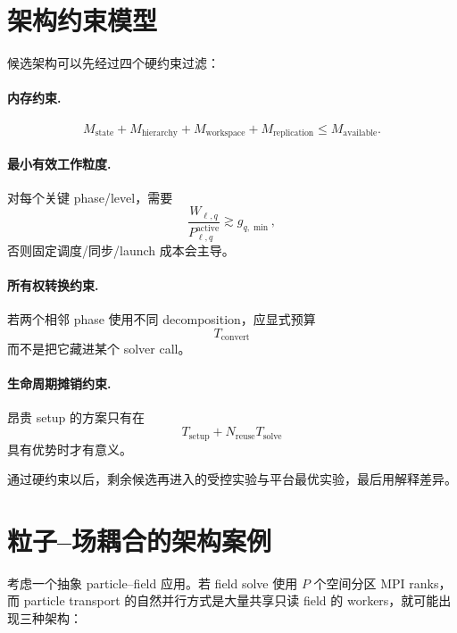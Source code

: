 \section{架构约束模型}

候选架构可以先经过四个硬约束过滤：

\paragraph{内存约束.}
\begin{equation}
M_{\mathrm{state}}
+
M_{\mathrm{hierarchy}}
+
M_{\mathrm{workspace}}
+
M_{\mathrm{replication}}
\le
M_{\mathrm{available}}.
\end{equation}

\paragraph{最小有效工作粒度.}
对每个关键 phase/level，需要
\begin{equation}
\frac{W_{\ell,q}}
{P_{\ell,q}^{\mathrm{active}}}
\gtrsim
g_{q,\min},
\end{equation}
否则固定调度/同步/launch 成本会主导。

\paragraph{所有权转换约束.}
若两个相邻 phase 使用不同 decomposition，应显式预算
\begin{equation}
T_{\mathrm{convert}}
\end{equation}
而不是把它藏进某个 solver call。

\paragraph{生命周期摊销约束.}
昂贵 setup 的方案只有在
\begin{equation}
T_{\mathrm{setup}}
+
N_{\mathrm{reuse}}T_{\mathrm{solve}}
\end{equation}
具有优势时才有意义。

通过硬约束以后，剩余候选再进入的受控实验与平台最优实验，最后用解释差异。

\section{粒子--场耦合的架构案例}

考虑一个抽象 particle--field 应用。若 field solve 使用 $P$ 个空间分区 MPI ranks，而 particle transport 的自然并行方式是大量共享只读 field 的 workers，就可能出现三种架构：

